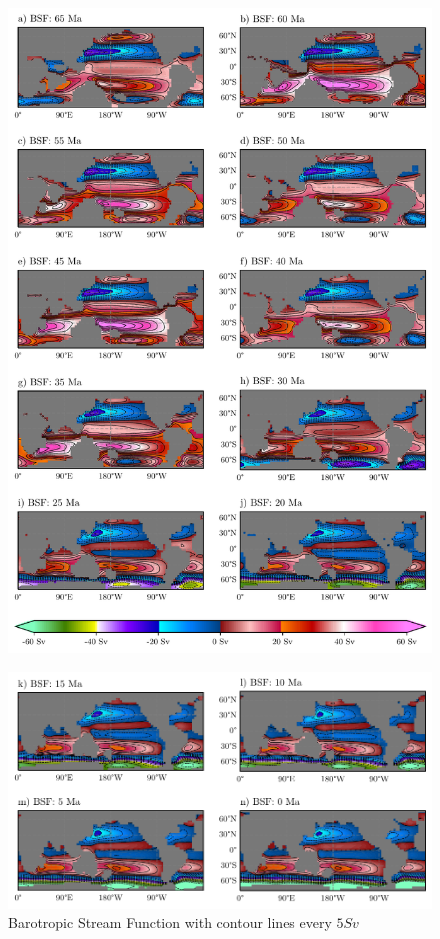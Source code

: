 \documentclass[a4paper]{article}
\begin{document}
\begin{multicols}{2}


\end{multicols}
\begin{figure}[H]

\includegraphics[width=1\linewidth]{BSF_1.pdf}
\end{figure}
\begin{figure}[H]
\includegraphics[width=1\linewidth]{BSF_2.pdf}
\caption{Barotropic Stream Function with contour lines every $5 Sv$}
\label{fig:bsf_total}
\end{figure}
\end{document}
